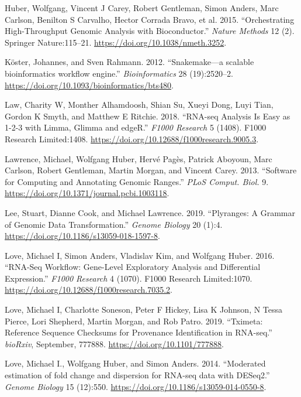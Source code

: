 \documentclass[
]{article}
\begin{document}
\leavevmode\hypertarget{ref-bioc}{}%
Huber, Wolfgang, Vincent J Carey, Robert Gentleman, Simon Anders, Marc Carlson, Benilton S Carvalho, Hector Corrada Bravo, et al. 2015. ``Orchestrating High-Throughput Genomic Analysis with Bioconductor.'' \emph{Nature Methods} 12 (2). Springer Nature:115--21. \url{https://doi.org/10.1038/nmeth.3252}.

\leavevmode\hypertarget{ref-snakemake}{}%
Köster, Johannes, and Sven Rahmann. 2012. ``Snakemake---a scalable bioinformatics workflow engine.'' \emph{Bioinformatics} 28 (19):2520--2. \url{https://doi.org/10.1093/bioinformatics/bts480}.

\leavevmode\hypertarget{ref-Law2018-f1000}{}%
Law, Charity W, Monther Alhamdoosh, Shian Su, Xueyi Dong, Luyi Tian, Gordon K Smyth, and Matthew E Ritchie. 2018. ``RNA-seq Analysis Is Easy as 1-2-3 with Limma, Glimma and edgeR.'' \emph{F1000 Research} 5 (1408). F1000 Research Limited:1408. \url{https://doi.org/10.12688/f1000research.9005.3}.

\leavevmode\hypertarget{ref-granges}{}%
Lawrence, Michael, Wolfgang Huber, Hervé Pagès, Patrick Aboyoun, Marc Carlson, Robert Gentleman, Martin Morgan, and Vincent Carey. 2013. ``Software for Computing and Annotating Genomic Ranges.'' \emph{PLoS Comput. Biol.} 9. \url{https://doi.org/10.1371/journal.pcbi.1003118}.

\leavevmode\hypertarget{ref-Lee2019}{}%
Lee, Stuart, Dianne Cook, and Michael Lawrence. 2019. ``Plyranges: A Grammar of Genomic Data Transformation.'' \emph{Genome Biology} 20 (1):4. \url{https://doi.org/10.1186/s13059-018-1597-8}.

\leavevmode\hypertarget{ref-Love2016-f1000}{}%
Love, Michael I, Simon Anders, Vladislav Kim, and Wolfgang Huber. 2016. ``RNA-Seq Workflow: Gene-Level Exploratory Analysis and Differential Expression.'' \emph{F1000 Research} 4 (1070). F1000 Research Limited:1070. \url{https://doi.org/10.12688/f1000research.7035.2}.

\leavevmode\hypertarget{ref-Love2019-tximeta}{}%
Love, Michael I, Charlotte Soneson, Peter F Hickey, Lisa K Johnson, N Tessa Pierce, Lori Shepherd, Martin Morgan, and Rob Patro. 2019. ``Tximeta: Reference Sequence Checksums for Provenance Identification in RNA-seq.'' \emph{bioRxiv}, September, 777888. \url{https://doi.org/10.1101/777888}.

\leavevmode\hypertarget{ref-Love2014}{}%
Love, Michael I., Wolfgang Huber, and Simon Anders. 2014. ``Moderated estimation of fold change and dispersion for RNA-seq data with DESeq2.'' \emph{Genome Biology} 15 (12):550. \url{https://doi.org/10.1186/s13059-014-0550-8}.
\end{document}
